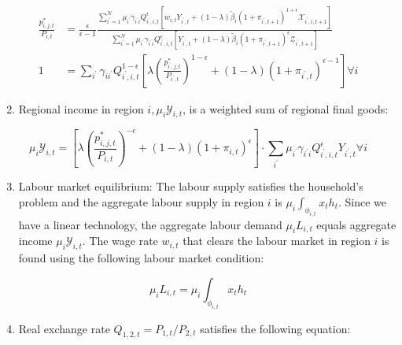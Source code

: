 \documentclass[10pt]{article}
\begin{document}
$$
\begin{aligned}
\frac{p_{i, j, t}^{*}}{P_{i, t}} & =\frac{\epsilon}{\epsilon-1} \frac{\sum_{i^{\prime}=1}^{N} \mu_{i^{\prime}} \gamma_{i^{\prime} i} Q_{i^{\prime}, i, t}^{\epsilon}\left[w_{i, t} Y_{i^{\prime}, t}+(1-\lambda) \tilde{\beta}_{i}\left(1+\pi_{i^{\prime}, t+1}\right)^{1+\epsilon} \mathcal{X}_{i^{\prime}, i, t+1}\right]}{\sum_{i^{\prime}=1}^{N} \mu_{i^{\prime}} \gamma_{i^{\prime} i} Q_{i^{\prime}, i, t}^{\epsilon}\left[Y_{i^{\prime}, t}+(1-\lambda) \tilde{\beta}_{i}\left(1+\pi_{i^{\prime}, t+1}\right)^{\epsilon} \mathcal{Z}_{i^{\prime}, t+1}\right]} \\
1 & =\sum_{i^{\prime}} \gamma_{i i^{\prime}} Q_{i^{\prime}, i, t}^{1-\epsilon}\left[\lambda\left(\frac{p_{i^{\prime}, j, t}^{*}}{P_{i^{\prime}, t}}\right)^{1-\epsilon}+(1-\lambda)\left(1+\pi_{i^{\prime}, t}\right)^{\epsilon-1}\right] \forall i
\end{aligned}
$$

\begin{enumerate}
  \setcounter{enumi}{1}
  \item Regional income in region $i, \mu_{i} \mathcal{Y}_{i, t}$, is a weighted sum of regional final goods:
\end{enumerate}

$$
\mu_{i} \mathcal{Y}_{i, t}=\left[\lambda\left(\frac{p_{i, j, t}^{*}}{P_{i, t}}\right)^{-\epsilon}+(1-\lambda)\left(1+\pi_{i, t}\right)^{\epsilon}\right] \cdot \sum_{i^{\prime}} \mu_{i^{\prime}} \gamma_{i^{\prime} i} Q_{i^{\prime}, i, t}^{\epsilon} Y_{i^{\prime}, t} \forall i
$$

\begin{enumerate}
  \setcounter{enumi}{2}
  \item Labour market equilibrium: The labour supply satisfies the household's problem and the aggregate labour supply in region $i$ is $\mu_{i} \int_{\phi_{i, t}} x_{t} h_{t}$. Since we have a linear technology, the aggregate labour demand $\mu_{i} L_{i, t}$ equals aggregate income $\mu_{i} \mathcal{Y}_{i, t}$. The wage rate $w_{i, t}$ that clears the labour market in region $i$ is found using the following labour market condition:
\end{enumerate}

$$
\mu_{i} L_{i, t}=\mu_{i} \int_{\phi_{i, t}} x_{t} h_{t}
$$

\begin{enumerate}
  \setcounter{enumi}{3}
  \item Real exchange rate $Q_{1,2, t}=P_{1, t} / P_{2, t}$ satisfies the following equation:
\end{enumerate}
\end{document}
